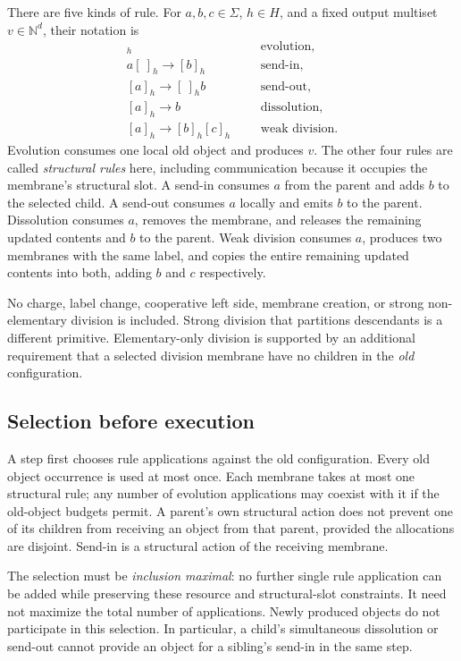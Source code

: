 \documentclass[11pt,letterpaper]{article}
\theoremstyle{definition}
\theoremstyle{remark}
\newcommand{\N}{\mathbb N}
\begin{document}
There are five kinds of rule. For $a,b,c\in\Sigma$, $h\in H$, and a fixed output multiset $v\in\N^d$, their notation is
\begin{align*}
 [a\to v]_h &&&\text{evolution},\\
 a[\ ]_h\to[b]_h &&&\text{send-in},\\
 [a]_h\to[\ ]_h b &&&\text{send-out},\\
 [a]_h\to b &&&\text{dissolution},\\
 [a]_h\to[b]_h[c]_h &&&\text{weak division}.
\end{align*}
Evolution consumes one local old object and produces $v$. The other four rules are called \emph{structural rules} here, including communication because it occupies the membrane's structural slot. A send-in consumes $a$ from the parent and adds $b$ to the selected child. A send-out consumes $a$ locally and emits $b$ to the parent. Dissolution consumes $a$, removes the membrane, and releases the remaining updated contents and $b$ to the parent. Weak division consumes $a$, produces two membranes with the same label, and copies the entire remaining updated contents into both, adding $b$ and $c$ respectively.

No charge, label change, cooperative left side, membrane creation, or strong non-elementary division is included. Strong division that partitions descendants is a different primitive. Elementary-only division is supported by an additional requirement that a selected division membrane have no children in the \emph{old} configuration.

\subsection{Selection before execution}
A step first chooses rule applications against the old configuration. Every old object occurrence is used at most once. Each membrane takes at most one structural rule; any number of evolution applications may coexist with it if the old-object budgets permit. A parent's own structural action does not prevent one of its children from receiving an object from that parent, provided the allocations are disjoint. Send-in is a structural action of the receiving membrane.

The selection must be \emph{inclusion maximal}: no further single rule application can be added while preserving these resource and structural-slot constraints. It need not maximize the total number of applications. Newly produced objects do not participate in this selection. In particular, a child's simultaneous dissolution or send-out cannot provide an object for a sibling's send-in in the same step.
\end{document}
